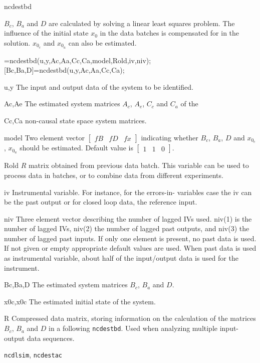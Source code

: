 \documentclass{book}
\newcommand{\mat}[2]{\left[\begin{array}{#1}#2\end{array}\right]}
\newcommand{\ncdestac}{\texttt{ncdestac}} %
\newcommand{\ncdestbd}{\texttt{ncdestbd}}
\newcommand{\ncdlsim}{\texttt{ncdlsim}}
\begin{document}
\begin{command}{ncdestbd}
\begin{purpose}
  $B_c$, $B_a$ and $D$ are calculated by solving a linear least
  squares problem. The influence of the initial state $x_0$ in the
  data batches is compensated for in the solution.  $x_{0_c}$ and
  $x_{0_a}$ can also be estimated.
\end{purpose}
\begin{syntax}
  [Bc,Ba,D,x0c,x0a,R]=ncdestbd(u,y,Ac,Aa,Cc,Ca,model,Rold,iv,niv);
  [Bc,Ba,D]=ncdestbd(u,y,Ac,Aa,Cc,Ca);
\end{syntax}
\begin{inputs}
\item[u,y] The input and output data of the system to be
  identified.
\item[Ac,Ae] The estimated system matrices $A_c$, $A_e$, $C_c$ and
  $C_a$ of the
\item[Cc,Ca] non-causal state space system matrices.
\item[model] Two element vector $\mat{ccc}{fB&fD&fx}$ indicating
  whether $B_c$, $B_a$, $D$ and $x_{0_c}$, $x_{0_a}$ should be
  estimated. Default value is $\mat{ccc}{1&1&0}$.
\item[Rold] $R$ matrix obtained from previous data batch. This variable
  can be used to process data in batches, or to combine data from
  different experiments. 
\item[iv] Instrumental variable. For instance, for the errors-in-
  variables case the iv can be the past output or for closed loop
  data, the reference input.
\item[niv] Three element vector describing the number of lagged IVs
  used. niv(1) is the number of lagged IVs, niv(2) the number
  of lagged past outputs, and niv(3) the number of lagged past
  inputs. If only one element is present, no past data is
  used. If not given or empty appropriate default values are used.
  When past data is used as instrumental variable, about half
  of the input/output data is used for the instrument.
\end{inputs}
\begin{outputs}
\item[Bc,Ba,D] The estimated system matrices $B_c$, $B_a$ and $D$.
\item[x0c,x0c] The estimated initial state of the system.
\item[R] Compressed data matrix, storing information on the
  calculation of the matrices $B_c$, $B_a$ and $D$ in a following
  {\ncdestbd}. Used when analyzing multiple input-output data
  sequences.
\end{outputs}
\begin{seealso}
{\ncdlsim}, {\ncdestac}
\end{seealso}
\end{command}%
\end{document}
